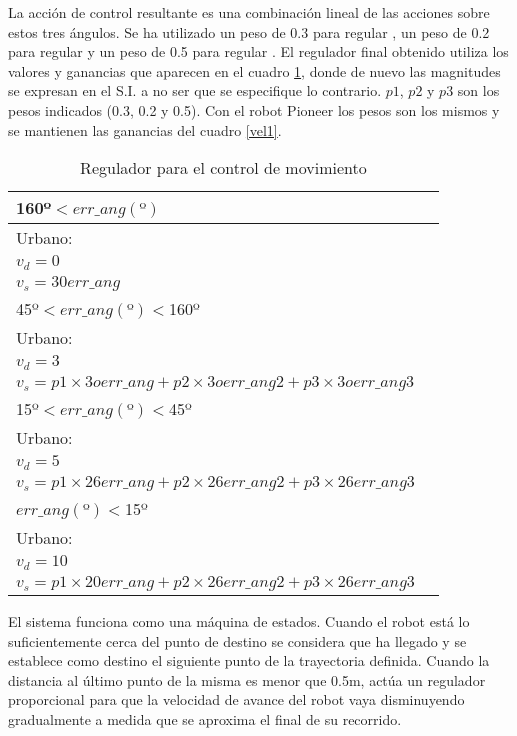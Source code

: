 La acción de control resultante es una combinación lineal de las acciones sobre estos tres ángulos. Se ha utilizado un peso de 0.3 para regular , un peso de 0.2 para regular  y un peso de 0.5 para regular . El regulador final obtenido utiliza los valores y ganancias que aparecen en el cuadro \ref{vel2}, donde de nuevo las magnitudes se expresan en el S.I. a no ser que se especifique lo contrario. $p1$, $p2$ y $p3$ son los pesos indicados (0.3, 0.2 y 0.5).
Con el robot Pioneer los pesos son los mismos y se mantienen las ganancias del cuadro \ref{vel1}.

\begin{table}[hbt]
\begin{center}
\caption{Regulador para el control de movimiento}
\label{vel2}

\vspace{5mm}

\begin{tabular}{ll}
\hline\hline
160º$<err\_ang(º)$ \\ \hline
Urbano:\\
$v_{d}=0$ \\
$v_{s}=30err\_ang$\\
\hline
  45º$<err\_ang(º)<$160º \\ \hline
Urbano:\\
   $v_{d}=3$ \\
  $v_{s}=p1\times3oerr\_ang + p2\times3oerr\_ang2 + p3\times3oerr\_ang3$ \\
\hline
15º$<err\_ang(º)<$45º \\ \hline
Urbano:\\
$v_{d}=5$ \\
$v_{s}=p1\times26err\_ang + p2\times26err\_ang2 + p3\times26err\_ang3$\\
\hline
$err\_ang(º)<$15º \\ \hline
Urbano: \\
$v_{d}=10$\\
 $v_{s}=p1\times20err\_ang + p2\times26err\_ang2 + p3\times26err\_ang3$\\
\hline\hline
\end{tabular}
\end{center}
\end{table}

El sistema funciona como una máquina de estados. Cuando el robot está lo suficientemente cerca del punto de destino se considera que ha llegado y se establece como destino el siguiente punto de la trayectoria definida. Cuando la distancia al último punto de la misma es menor que 0.5m, actúa un regulador proporcional para que la velocidad de avance del robot vaya disminuyendo gradualmente a medida que se aproxima el final de su recorrido.

